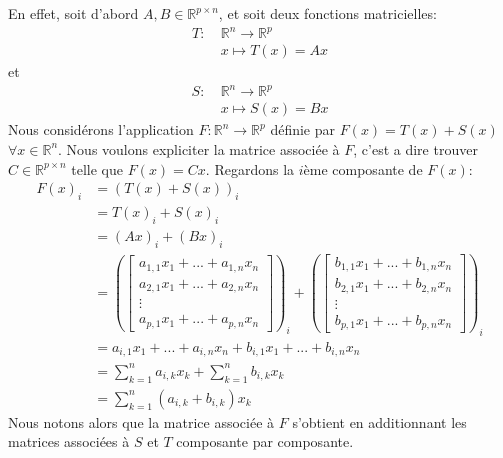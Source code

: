\documentclass{article}
\newcommand{\R}{\mathbb{R}}
\newcommand{\cross}{\times}
\begin{document}
\noindent En effet, soit d'abord $A,B \in \R^{p \cross n}$, et soit deux fonctions matricielles:
\begin{align*}
    T: \ &\R^n \to \R^p\\
    &x \mapsto T(x) = Ax
\end{align*}
et 
\begin{align*}
    S: \ &\R^n \to \R^p\\
    &x \mapsto S(x) = Bx
\end{align*}
Nous considérons l'application $F: \R^n \to \R^p$ définie par $F(x) = T(x) + S(x)$ $\forall x \in \R^n$. Nous voulons expliciter la matrice associée à $F$, c'est a dire trouver $C \in \R^{p \cross n}$ telle que $F(x) = Cx$. Regardons la $i$ème composante de $F(x)$:
\begin{align*}
    F(x)_i &= (T(x) + S(x))_i \\
    &= T(x)_i + S(x)_i \\
    &= (Ax)_i + (Bx)_i \\
    &= \left(\begin{bmatrix} a_{1,1}x_1 +  ... + a_{1, n}x_n \\ a_{2,1}x_1 +  ... + a_{2, n}x_n \\ \vdots \\ a_{p,1}x_1 + ... + a_{p, n}x_n \end{bmatrix}\right)_i + \left(\begin{bmatrix} b_{1,1}x_1 +  ... + b_{1, n}x_n \\ b_{2,1}x_1 +  ... + b_{2, n}x_n \\ \vdots \\ b_{p,1}x_1 + ... + b_{p, n}x_n \end{bmatrix}\right)_i \\
    &= a_{i,1}x_1 +  ... + a_{i, n}x_n + b_{i,1}x_1 + ... + b_{i, n}x_n \\
    &= \sum_{k=1}^{n} a_{i,k} x_k + \sum_{k=1}^{n} b_{i,k} x_k \\
    &= \sum_{k=1}^{n} (a_{i,k} + b_{i,k}) x_k
\end{align*} %
\noindent Nous notons alors que la matrice associée à $F$ s'obtient en additionnant les matrices associées à $S$ et $T$ composante par composante. \\
\end{document}
